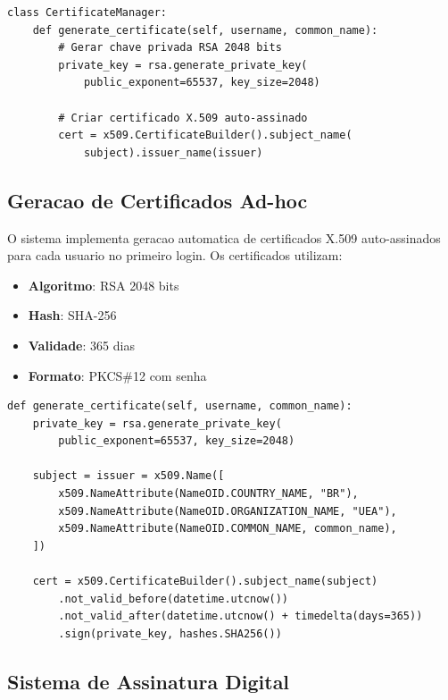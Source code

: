 \documentclass[12pt,a4paper,oneside]{article}
\begin{document}
\begin{lstlisting}[caption=Estrutura da aplicacao de chat]
class CertificateManager:
    def generate_certificate(self, username, common_name):
        # Gerar chave privada RSA 2048 bits
        private_key = rsa.generate_private_key(
            public_exponent=65537, key_size=2048)
        
        # Criar certificado X.509 auto-assinado
        cert = x509.CertificateBuilder().subject_name(
            subject).issuer_name(issuer)
\end{lstlisting}

\subsection{Geracao de Certificados Ad-hoc}

O sistema implementa geracao automatica de certificados X.509 auto-assinados para cada usuario no primeiro login. Os certificados utilizam:

\begin{itemize}
    \item \textbf{Algoritmo}: RSA 2048 bits
    \item \textbf{Hash}: SHA-256
    \item \textbf{Validade}: 365 dias
    \item \textbf{Formato}: PKCS\#12 com senha
\end{itemize}

\begin{lstlisting}[caption=Processo de geracao de certificado]
def generate_certificate(self, username, common_name):
    private_key = rsa.generate_private_key(
        public_exponent=65537, key_size=2048)
    
    subject = issuer = x509.Name([
        x509.NameAttribute(NameOID.COUNTRY_NAME, "BR"),
        x509.NameAttribute(NameOID.ORGANIZATION_NAME, "UEA"),
        x509.NameAttribute(NameOID.COMMON_NAME, common_name),
    ])
    
    cert = x509.CertificateBuilder().subject_name(subject)
        .not_valid_before(datetime.utcnow())
        .not_valid_after(datetime.utcnow() + timedelta(days=365))
        .sign(private_key, hashes.SHA256())
\end{lstlisting}

\subsection{Sistema de Assinatura Digital}
\end{document}
